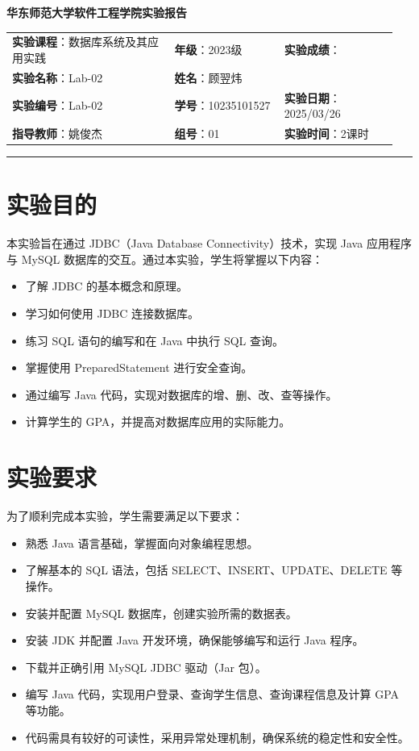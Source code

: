 \documentclass{article}
\begin{document}
	\begin{center}
		{\Large{\textbf{\heiti 华东师范大学软件工程学院实验报告}}}
		\begin{table}[htb]
			\flushleft
			\begin{tabular}{p{0.4\linewidth}p{0.27\linewidth}p{0.28\linewidth}}\\
				\textbf{实验课程}：数据库系统及其应用实践  & \textbf{年级}：2023级       & \textbf{实验成绩}：  \\
				\textbf{实验名称}：Lab-02 & \textbf{姓名}：顾翌炜         &                 \\
				\textbf{实验编号}：Lab-02     & \textbf{学号}：10235101527 & \textbf{实验日期}：2025/03/26  \\
				\textbf{指导教师}：姚俊杰     & \textbf{组号}：01            & \textbf{实验时间}：2课时  \\ 
			\end{tabular}
		\end{table}
	\end{center}
	\rule{\textwidth}{2pt}
	
	\section{实验目的}
	本实验旨在通过 JDBC（Java Database Connectivity）技术，实现 Java 应用程序与 MySQL 数据库的交互。通过本实验，学生将掌握以下内容：
	\begin{itemize}
		\item 了解 JDBC 的基本概念和原理。
		\item 学习如何使用 JDBC 连接数据库。
		\item 练习 SQL 语句的编写和在 Java 中执行 SQL 查询。
		\item 掌握使用 PreparedStatement 进行安全查询。
		\item 通过编写 Java 代码，实现对数据库的增、删、改、查等操作。
		\item 计算学生的 GPA，并提高对数据库应用的实际能力。
	\end{itemize}
	
	\section{实验要求}
	为了顺利完成本实验，学生需要满足以下要求：
	\begin{itemize}
		\item 熟悉 Java 语言基础，掌握面向对象编程思想。
		\item 了解基本的 SQL 语法，包括 SELECT、INSERT、UPDATE、DELETE 等操作。
		\item 安装并配置 MySQL 数据库，创建实验所需的数据表。
		\item 安装 JDK 并配置 Java 开发环境，确保能够编写和运行 Java 程序。
		\item 下载并正确引用 MySQL JDBC 驱动（Jar 包）。
		\item 编写 Java 代码，实现用户登录、查询学生信息、查询课程信息及计算 GPA 等功能。
		\item 代码需具有较好的可读性，采用异常处理机制，确保系统的稳定性和安全性。
	\end{itemize}
	
\end{document}

